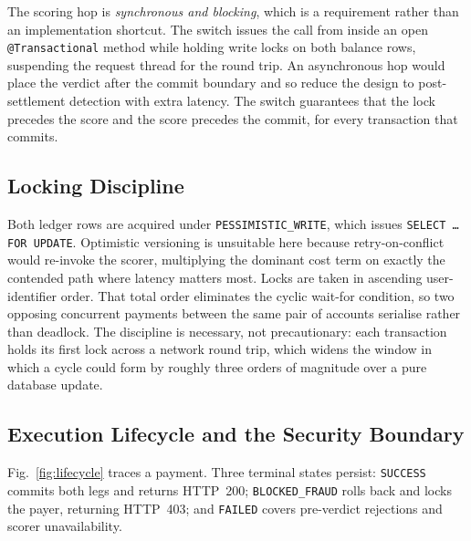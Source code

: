 \documentclass[conference]{IEEEtran}
\begin{document}
The scoring hop is \emph{synchronous and blocking}, which is a
requirement rather than an implementation shortcut. The switch issues
the call from inside an open \texttt{@Transactional} method while
holding write locks on both balance rows, suspending the request thread
for the round trip. An asynchronous hop would place the verdict after
the commit boundary and so reduce the design to post-settlement
detection with extra latency. The switch guarantees that the lock
precedes the score and the score precedes the commit, for every
transaction that commits.

\subsection{Locking Discipline}

Both ledger rows are acquired under \texttt{PESSIMISTIC\_WRITE}, which
issues \texttt{SELECT \ldots{} FOR UPDATE}. Optimistic versioning is
unsuitable here because retry-on-conflict would re-invoke the scorer,
multiplying the dominant cost term on exactly the contended path where
latency matters most. Locks are taken in ascending user-identifier
order. That total order eliminates the cyclic wait-for condition, so
two opposing concurrent payments between the same pair of accounts
serialise rather than deadlock. The discipline is necessary, not
precautionary: each transaction holds its first lock across a network
round trip, which widens the window in which a cycle could form by
roughly three orders of magnitude over a pure database update.

\subsection{Execution Lifecycle and the Security Boundary}

Fig.~\ref{fig:lifecycle} traces a payment. Three terminal states
persist: \texttt{SUCCESS} commits both legs and returns HTTP~200;
\texttt{BLOCKED\_FRAUD} rolls back and locks the payer, returning
HTTP~403; and \texttt{FAILED} covers pre-verdict rejections and scorer
unavailability.
\end{document}
